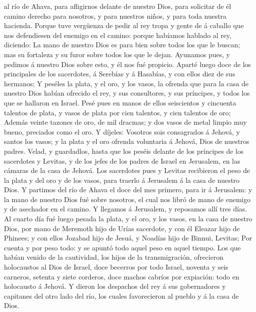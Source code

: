al río de Ahava, para afligirnos delante de nuestro Dios, para solicitar
de él camino derecho para nosotros, y para nuestros niños, y para toda
nuestra hacienda.  Porque tuve vergüenza de pedir al rey
tropa y gente de á caballo que nos defendiesen del enemigo en el camino:
porque habíamos hablado al rey, diciendo: La mano de nuestro Dios es
para bien sobre todos los que le buscan; mas su fortaleza y su furor
sobre todos los que le dejan.  Ayunamos pues, y pedimos á
nuestro Dios sobre esto, y él nos fué propicio.  Aparté
luego doce de los principales de los sacerdotes, á Serebías y á
Hasabías, y con ellos diez de sus hermanos;  Y peséles la
plata, y el oro, y los vasos, la ofrenda que para la casa de nuestro
Dios habían ofrecido el rey, y sus consultores, y sus príncipes, y todos
los que se hallaron en Israel.  Pesé pues en manos de
ellos seiscientos y cincuenta talentos de plata, y vasos de plata por
cien talentos, y cien talentos de oro;  Además veinte
tazones de oro, de mil dracmas; y dos vasos de metal limpio muy bueno,
preciados como el oro.  Y díjeles: Vosotros sois
consagrados á Jehová, y santos los vasos; y la plata y el oro ofrenda
voluntaria á Jehová, Dios de nuestros padres.  Velad, y
guardadlos, hasta que los peséis delante de los príncipes de los
sacerdotes y Levitas, y de los jefes de los padres de Israel en
Jerusalem, en las cámaras de la casa de Jehová.  Los
sacerdotes pues y Levitas recibieron el peso de la plata y del oro y de
los vasos, para traerlo á Jerusalem á la casa de nuestro Dios.
 Y partimos del río de Ahava el doce del mes primero,
para ir á Jerusalem: y la mano de nuestro Dios fué sobre nosotros, el
cual nos libró de mano de enemigo y de asechador en el camino.
 Y llegamos á Jerusalem, y reposamos allí tres días.
 Al cuarto día fué luego pesada la plata, y el oro, y los
vasos, en la casa de nuestro Dios, por mano de Meremoth hijo de Urías
sacerdote, y con él Eleazar hijo de Phinees; y con ellos Jozabad hijo de
Jesuá, y Noadías hijo de Binnui, Levitas;  Por cuenta y
por peso todo: y se apuntó todo aquel peso en aquel tiempo.
 Los que habían venido de la cautividad, los hijos de la
transmigración, ofrecieron holocaustos al Dios de Israel, doce becerros
por todo Israel, noventa y seis carneros, setenta y siete corderos, doce
machos cabríos por expiación: todo en holocausto á Jehová.
 Y dieron los despachos del rey á sus gobernadores y
capitanes del otro lado del río, los cuales favorecieron al pueblo y á
la casa de Dios.

